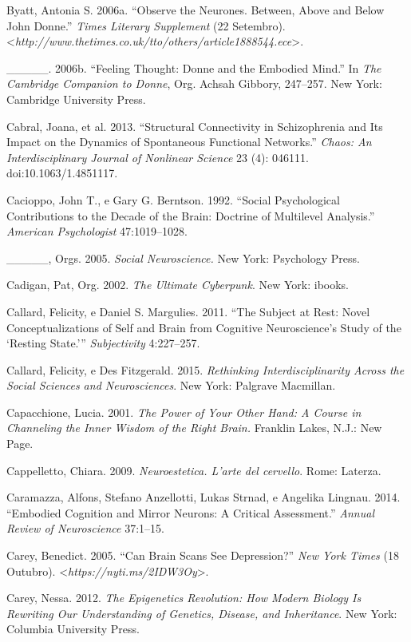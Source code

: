 {\begin{Parskip}
Byatt, Antonia S. 2006a. ``Observe the Neurones. Between, Above and
Below John Donne.'' \emph{Times Literary Supplement} (22 Setembro).
\textless{}\emph{http://www.thetimes.co.uk/tto/others/article1888544.ece}\textgreater{}.

\_\_\_\_\_. 2006b. ``Feeling Thought: Donne and the Embodied Mind.'' In
\emph{The Cambridge Companion to Donne}, Org. Achsah Gibbory, 247--257.
New York: Cambridge University Press.

Cabral, Joana, et al. 2013. ``Structural Connectivity in Schizophrenia
and Its Impact on the Dynamics of Spontaneous Functional Networks.''
\emph{Chaos: An Interdisciplinary Journal of Nonlinear Science} 23 (4):
046111. doi:10.1063/1.4851117.

Cacioppo, John T., e Gary G. Berntson. 1992. ``Social Psychological
Contributions to the Decade of the Brain: Doctrine of Multilevel
Analysis.'' \emph{American Psychologist} 47:1019--1028.

\_\_\_\_\_, Orgs. 2005. \emph{Social Neuroscience.} New York: Psychology
Press.

Cadigan, Pat, Org. 2002. \emph{The Ultimate Cyberpunk}. New York:
ibooks.

Callard, Felicity, e Daniel S. Margulies. 2011. ``The Subject at Rest:
Novel Conceptualizations of Self and Brain from Cognitive Neuroscience's
Study of the `Resting State.''' \emph{Subjectivity} 4:227--257.

Callard, Felicity, e Des Fitzgerald. 2015. \emph{Rethinking
Interdisciplinarity Across the Social Sciences and Neurosciences}. New
York: Palgrave Macmillan.

Capacchione, Lucia. 2001. \emph{The Power of Your Other Hand: A Course
in Channeling the Inner Wisdom of the Right Brain.} Franklin Lakes,
N.J.: New Page.

Cappelletto, Chiara. 2009. \emph{Neuroestetica. L'arte del cervello}.
Rome: Laterza.

Caramazza, Alfons, Stefano Anzellotti, Lukas Strnad, e Angelika Lingnau.
2014. ``Embodied Cognition and Mirror Neurons: A Critical Assessment.''
\emph{Annual Review of Neuroscience} 37:1--15.

Carey, Benedict. 2005. ``Can Brain Scans See Depression?'' \emph{New
York Times} (18 Outubro).
\textless{}\emph{https://nyti.ms/2IDW3Oy}\textgreater{}.

Carey, Nessa. 2012. \emph{The Epigenetics Revolution: How Modern Biology
Is Rewriting Our Understanding of Genetics, Disease, and Inheritance}.
New York: Columbia University Press.


\end{Parskip}}
